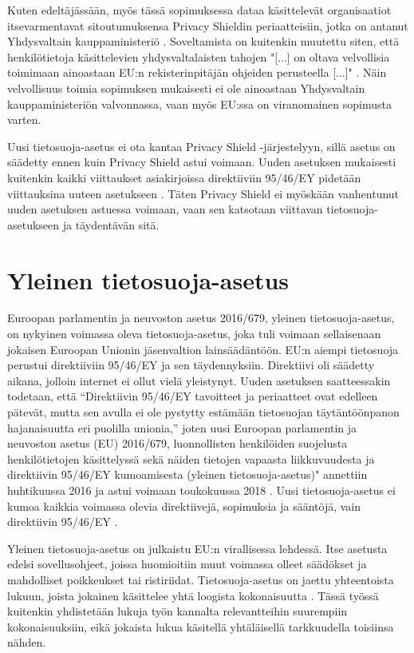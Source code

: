 \documentclass[finnish]{tktltiki}
\begin{document}
Kuten edeltäjässään, myös tässä sopimuksessa dataa käsittelevät organisaatiot itsevarmentavat sitoutumuksensa Privacy Shieldin periaatteisiin, jotka on antanut Yhdysvaltain kauppaministeriö \cite{privacy}. Soveltamista on kuitenkin muutettu siten, että henkilötietoja käsittelevien yhdysvaltalaisten tahojen "[...] on oltava velvollisia toimimaan ainoastaan EU:n rekisterinpitäjän ohjeiden perusteella [...]" \cite{privacy}. Näin velvollisuus toimia sopimuksen mukaisesti ei ole ainoastaan Yhdysvaltain kauppaministeriön valvonnassa, vaan myös EU:ssa on viranomainen sopimusta varten.

Uusi tietosuoja-asetus ei ota kantaa Privacy Shield -järjestelyyn, sillä asetus on säädetty ennen kuin Privacy Shield astui voimaan. Uuden asetuksen mukaisesti kuitenkin kaikki viittaukset asiakirjoissa direktiiviin 95/46/EY pidetään viittauksina uuteen asetukseen \cite{eu2016}. Täten Privacy Shield ei myöskään vanhentunut uuden asetuksen astuessa voimaan, vaan sen katsotaan viittavan tietosuoja-asetukseen ja täydentävän sitä.


\newpage
\section{Yleinen tietosuoja-asetus}

Euroopan parlamentin ja neuvoston asetus 2016/679, yleinen tietosuoja-asetus, on nykyinen voimassa oleva tietosuoja-asetus, joka tuli voimaan sellaisenaan jokaisen Euroopan Unionin jäsenvaltion lainsäädäntöön. EU:n aiempi tietosuoja perustui direktiiviin 95/46/EY ja sen täydennyksiin. Direktiivi oli säädetty aikana, jolloin internet ei ollut vielä yleistynyt. Uuden asetuksen saatteessakin todetaan, että “Direktiivin 95/46/EY tavoitteet ja periaatteet ovat edelleen pätevät, mutta sen avulla ei ole pystytty estämään tietosuojan täytäntöönpanon hajanaisuutta eri puolilla unionia,” \cite{eu2016} joten uusi Euroopan parlamentin ja neuvoston asetus (EU) 2016/679, luonnollisten henkilöiden suojelusta henkilötietojen käsittelyssä sekä näiden tietojen vapaasta liikkuvuudesta ja direktiivin 95/46/EY kumoamisesta (yleinen tietosuoja-asetus)" annettiin huhtikuussa 2016 ja astui voimaan toukokuussa 2018 \cite{eu2016}. Uusi tietosuoja-asetus ei kumoa kaikkia voimassa olevia direktiivejä, sopimuksia ja sääntöjä, vain direktiivin 95/46/EY \cite{eu2016}.

Yleinen tietosuoja-asetus on julkaistu EU:n virallisessa lehdessä. Itse asetusta edelsi sovellusohjeet, joissa huomioitiin muut voimassa olleet säädökset ja mahdolliset poikkeukset tai ristiriidat. Tietosuoja-asetus on jaettu yhteentoista lukuun, joista jokainen käsittelee yhtä loogista kokonaisuutta \cite{eu2016}. Tässä työssä kuitenkin yhdistetään lukuja työn kannalta relevantteihin suurempiin kokonaisuuksiin, eikä jokaista lukua käsitellä yhtäläisellä tarkkuudella toisiinsa nähden.
\end{document}
